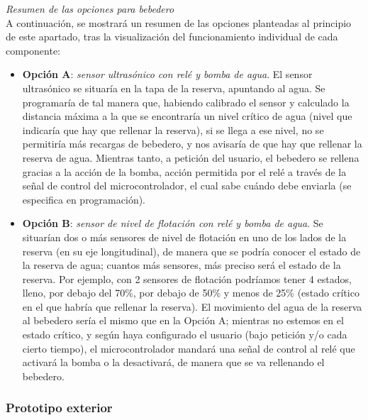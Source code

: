 \documentclass[12pt]{article}
\begin{document}
	\noindent \textit{Resumen de las opciones para bebedero}
	 \\
	 
	 \noindent A continuación, se mostrará un resumen de las opciones planteadas al principio de este apartado, tras la visualización del funcionamiento individual de cada componente:
	 
	 \begin{itemize}
	 	\item \textbf{Opción A}: \textit{sensor ultrasónico con relé y bomba de agua}. El sensor ultrasónico se situaría en la tapa de la reserva, apuntando al agua. Se programaría de tal manera que, habiendo calibrado el sensor y calculado la distancia máxima a la que se encontraría un nivel crítico de agua (nivel que indicaría que hay que rellenar la reserva), si se llega a ese nivel, no se permitiría más recargas de bebedero, y nos avisaría de que hay que rellenar la reserva de agua. Mientras tanto, a petición del usuario, el bebedero se rellena gracias a la acción de la bomba, acción permitida por el relé a través de la señal de control del microcontrolador, el cual sabe cuándo debe enviarla (se especifica en programación).
	 	\item \textbf{Opción B}: \textit{sensor de nivel de flotación con relé y bomba de agua}. Se situarían dos o más sensores de nivel de flotación en uno de los lados de la reserva (en su eje longitudinal), de manera que se podría conocer el estado de la reserva de agua; cuantos más sensores, más preciso será el estado de la reserva. Por ejemplo, con 2 sensores de flotación podríamos tener 4 estados, lleno, por debajo del 70\%, por debajo de 50\% y menos de 25\% (estado crítico en el que habría que rellenar la reserva). El movimiento del agua de la reserva al bebedero sería el mismo que en la Opción A; mientras no estemos en el estado crítico, y según haya configurado el usuario (bajo petición y/o cada cierto tiempo), el microcontrolador mandará una señal de control al relé que activará la bomba o la desactivará, de manera que se va rellenando el bebedero.
	 \end{itemize}
	
	\pagebreak
	
	\subsubsection{Prototipo exterior}
	
\end{document}

